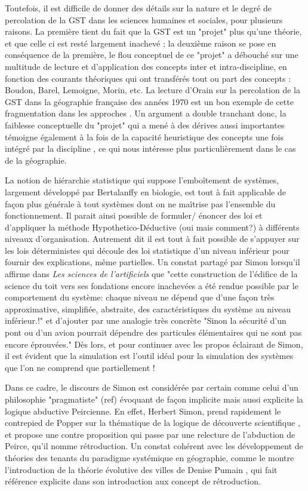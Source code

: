 Toutefois, il est difficile de donner des détails sur la nature et le degré de percolation de la GST dans les sciences humaines et sociales, pour plusieurs raisons. La première tient du fait que la GST est un "projet" plus qu'une théorie, et que celle ci est resté largement inachevé \autocite{Pouvreau2013}; la deuxième raison se pose en conséquence de la première, le flou conceptuel de ce "projet" a débouché sur une multitude de lecture et d'application des concepts inter et intra-discipline, en fonction des courants théoriques qui ont transférés tout ou part des concepts : Boudon, Barel, Lemoigne, Morin, etc. La lecture d'Orain sur la percolation de la GST dans la géographie française des années 1970 est un bon exemple de cette fragmentation dans les approches \autocite{Orain2001}. Un argument a double tranchant donc,  la faiblesse conceptuelle du "projet" qui a mené à des dérives aussi importantes témoigne également à la fois de la capacité heuristique des concepts une fois intégré par la discipline \autocite{Lallement2014}, ce qui nous intéresse plus particulièrement dans le cas de la géographie.

La notion de hiérarchie statistique qui suppose l’emboîtement de systèmes, largement développé par Bertalanffy en biologie, est tout à fait applicable de façon plus générale à tout systèmes dont on ne maîtrise pas l'ensemble du fonctionnement. Il parait ainsi possible de formuler/ énoncer des loi et d'appliquer la méthode Hypothetico-Déductive (oui mais comment?) à différents niveaux d'organisation. Autrement dit il est tout à fait possible de s'appuyer sur les lois déterministes qui découle des loi statistique d'un niveau inférieur pour fournir des explications, même partielles. Un constat partagé par Simon lorsqu'il affirme dans \textit{Les sciences de l'artificiels} que "cette construction de l'édifice de la science du toit vers ses fondations encore inachevées a été rendue possible par le comportement du système: chaque niveau ne dépend que d'une façon très approximative, simplifiée, abstraite, des caractéristiques du système au niveau inférieur.!" et d'ajouter par une analogie très concrète "Sinon la sécurité d'un pont ou d'un avion pourrait dépendre des particules élémentaires qui ne sont pas encore éprouvées." \autocite[48-49]{Simon2004} Dès lors, et pour continuer avec les propos éclairant de Simon, il est évident que la simulation est l'outil idéal pour la simulation des systèmes que l'on ne comprend que partiellement ! 

Dans ce cadre, le discours de Simon est considérée par certain comme celui d'un philosophie "pragmatiste"  (ref) évoquant de façon implicite mais aussi explicite la logique abductive Peircienne. En effet, Herbert Simon, prend rapidement le contrepied de Popper sur la thématique de la logique de découverte scientifique \autocite{Simon1973}, et propose une contre proposition qui passe par une relecture de l'abduction de Peirce, qu'il nomme rétroduction. Un constat cohérent avec les développement de théories des tenants du paradigme systémique en géographie, comme le montre l'introduction de la théorie évolutive des villes de Denise Pumain \autocite{Pumain91}, qui fait référence explicite dans son introduction aux concept de rétroduction.

